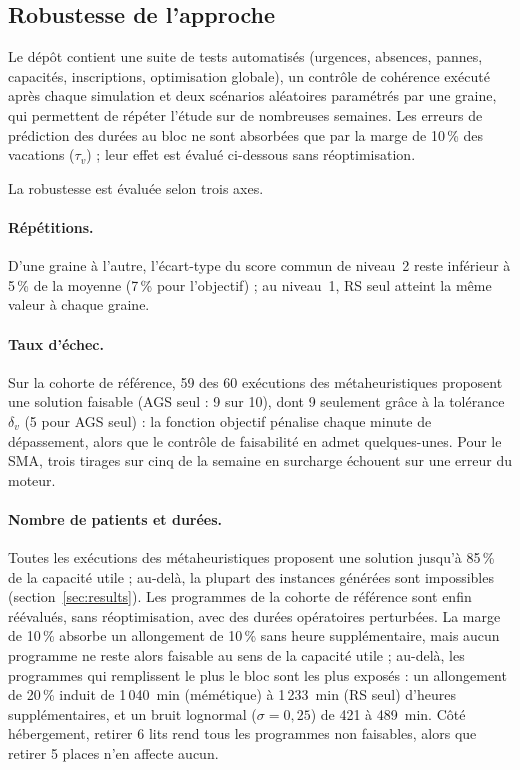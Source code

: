 \documentclass[11pt,a4paper]{article}
\begin{document}
\subsection{Robustesse de l'approche}

Le dépôt contient une suite de tests automatisés (urgences, absences, pannes, capacités, inscriptions, optimisation globale), un contrôle de cohérence exécuté après chaque simulation et deux scénarios aléatoires paramétrés par une graine, qui permettent de répéter l'étude sur de nombreuses semaines. Les erreurs de prédiction des durées au bloc ne sont absorbées que par la marge de 10\,\% des vacations ($\tau_v$) ; leur effet est évalué ci-dessous sans réoptimisation.

La robustesse est évaluée selon trois axes.

\paragraph{Répétitions.} D'une graine à l'autre, l'écart-type du score commun de niveau~2 reste inférieur à 5\,\% de la moyenne (7\,\% pour l'objectif) ; au niveau~1, RS seul atteint la même valeur à chaque graine.

\paragraph{Taux d'échec.} Sur la cohorte de référence, 59 des 60 exécutions des métaheuristiques proposent une solution faisable (AGS seul : 9 sur 10), dont 9 seulement grâce à la tolérance $\delta_v$ (5 pour AGS seul) : la fonction objectif pénalise chaque minute de dépassement, alors que le contrôle de faisabilité en admet quelques-unes. Pour le SMA, trois tirages sur cinq de la semaine en surcharge échouent sur une erreur du moteur.

\paragraph{Nombre de patients et durées.} Toutes les exécutions des métaheuristiques proposent une solution jusqu'à 85\,\% de la capacité utile ; au-delà, la plupart des instances générées sont impossibles (section~\ref{sec:results}). Les programmes de la cohorte de référence sont enfin réévalués, sans réoptimisation, avec des durées opératoires perturbées. La marge de 10\,\% absorbe un allongement de 10\,\% sans heure supplémentaire, mais aucun programme ne reste alors faisable au sens de la capacité utile ; au-delà, les programmes qui remplissent le plus le bloc sont les plus exposés : un allongement de 20\,\% induit de 1\,040~min (mémétique) à 1\,233~min (RS seul) d'heures supplémentaires, et un bruit lognormal ($\sigma=0{,}25$) de 421 à 489~min. Côté hébergement, retirer 6 lits rend tous les programmes non faisables, alors que retirer 5 places n'en affecte aucun.
\end{document}
